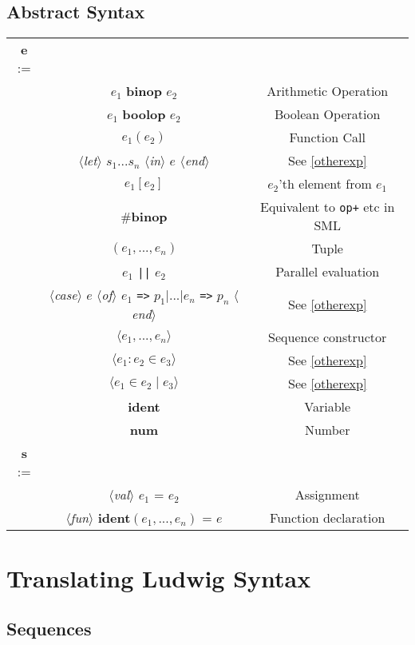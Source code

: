 \documentclass[11pt]{article}
\newcommand{\tok}[1]{$\langle$\emph{#1}$\rangle$}
\newcommand{\term}[1]{\textbf {#1}}
\begin{document}
\subsection{Abstract Syntax}
\begin{tabular}{| c c c |}
\hline
\term{e} := & &\\
& $e_1$ \term{binop} $e_2$ & Arithmetic Operation\\
& $e_1$ \term{boolop} $e_2$ & Boolean Operation\\
& $e_1(e_2)$ & Function Call\\
& \tok{let} $s_1...s_n$ \tok{in} $e$ \tok{end} & See \ref{otherexp}\\
& $e_1[e_2]$ & $e_2$'th element from $e_1$\\
& $\#$\term{binop} & Equivalent to \verb|op+| etc in SML\\
& $(e_1, ..., e_n)$ & Tuple\\
& $e_1$ \verb"||" $e_2$ & Parallel evaluation\\
& \tok{case} $e$ \tok{of} $e_1$ \verb"=>" $p_1 | ... | e_n$ \verb"=>" $p_n$ \tok{end} & See \ref{otherexp}\\
& $\langle e_1, ..., e_n \rangle$ & Sequence constructor\\
& $\langle e_1 : e_2 \in e_3 \rangle$ & See \ref{otherexp}\\
& $\langle e_1 \in e_2 \mid e_3\rangle$ & See \ref{otherexp}\\
& \term{ident} & Variable\\
& \term{num} & Number\\
\hline
\term{s} := & &\\
& \tok{val} $e_1$ = $e_2$ & Assignment\\
& \tok{fun} \term{ident}$(e_1, ..., e_n)$ = $e$ & Function declaration\\
\hline
\end{tabular}

\section{Translating Ludwig Syntax}

\subsection{Sequences}
\end{document}
